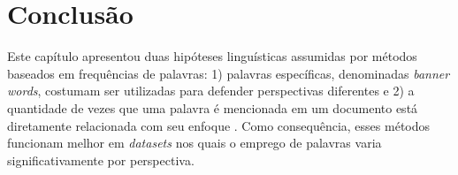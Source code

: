 

\section{Conclusão}

Este capítulo apresentou duas hipóteses linguísticas assumidas por métodos baseados em frequências de palavras: 1) palavras específicas, denominadas \emph{banner words}, costumam ser utilizadas para defender perspectivas diferentes e 2) a quantidade de vezes que uma palavra é mencionada em um documento está diretamente relacionada com seu enfoque \cite{teubert2001}. Como consequência, esses métodos funcionam melhor em \emph{datasets} nos quais o emprego de palavras varia significativamente por perspectiva. %

